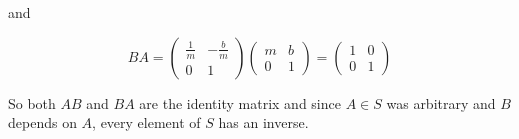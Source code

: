 \begin{solution}
    and
    
    $$BA=\left(\begin{array}{cc} \frac1m & -\frac{b}{m}\\ 0 & 1 \end{array}\right)
    \left(\begin{array}{cc} m & b\\ 0 & 1 \end{array}\right)=
    \left(\begin{array}{cc} 1 & 0\\ 0 & 1 \end{array}\right)$$
    
    So both $AB$ and $BA$ are the identity matrix and since $A\in S$ was arbitrary and $B$ depends on
    $A$, every element of $S$ has an inverse.

\end{solution}
